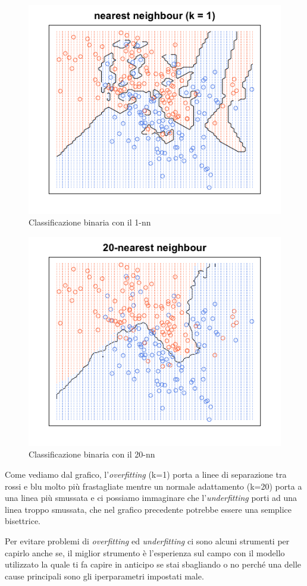 \begin{figure}[H]
	\centering
	\includegraphics[width=0.7\linewidth]{img/1nearestneigh}
	\caption{Classificazione binaria con il 1-nn}
	\label{fig:1nearestneigh}
\end{figure}

\begin{figure}[H]
	\centering
	\includegraphics[width=0.7\linewidth]{img/20nearestneigh}
	\caption{Classificazione binaria con il 20-nn}
	\label{fig:20nearestneigh}
\end{figure}
Come vediamo dal grafico, l'\textit{overfitting} (k=1) porta a linee di separazione tra rossi e blu molto pi\`u  frastagliate mentre un normale adattamento (k=20) porta a una linea pi\`u  smussata e ci possiamo immaginare che l'\textit{underfitting} porti ad una linea troppo smussata, che nel grafico precedente potrebbe essere una semplice bisettrice.

Per evitare problemi di \textit{overfitting} ed \textit{underfitting} ci sono alcuni strumenti per capirlo anche se, il miglior strumento \`e l'esperienza sul campo con il modello utilizzato la quale ti fa capire in anticipo se stai sbagliando o no perch\'e una delle cause principali sono gli iperparametri impostati male.

